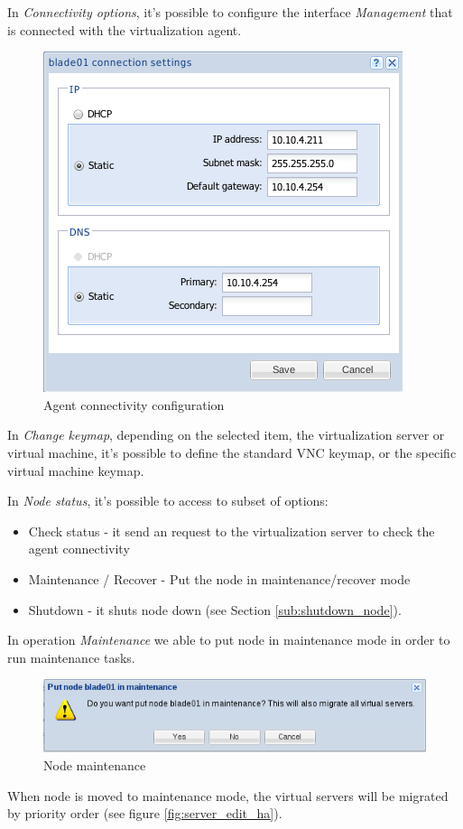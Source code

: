 In \emph{Connectivity options}, it's possible to configure the interface \emph{Management} that is connected with the virtualization agent. 
\begin{figure}[H]
	\begin{center}
	\includegraphics[scale=0.5]{screenshots/node_conn.png}
	\caption{Agent connectivity configuration}
	\label{fig:node_conn}
	\end{center}
\end{figure}

In \emph{Change keymap}, depending on the selected item, the virtualization server or virtual machine, it's possible to define the standard VNC keymap, or the specific virtual machine keymap.

In \emph{Node status}, it's possible to access to subset of options:
\begin{itemize}
    \item Check status - it send an request to the virtualization server to check the agent connectivity
    \item Maintenance / Recover - Put the node in maintenance/recover mode
    \item Shutdown - it shuts node down (see Section \ref{sub:shutdown_node}).
\end{itemize}

In operation \emph{Maintenance} we able to put node in maintenance mode in order to run maintenance tasks.
\begin{figure}[H]
   \begin{center}
   \includegraphics[scale=0.45]{screenshots/node_maintenance.png}
   \caption{Node maintenance}
   \label{fig:node_maintenance}
   \end{center}
\end{figure}
When node is moved to maintenance mode, the virtual servers will be migrated by priority order (see figure \ref{fig:server_edit_ha}).

